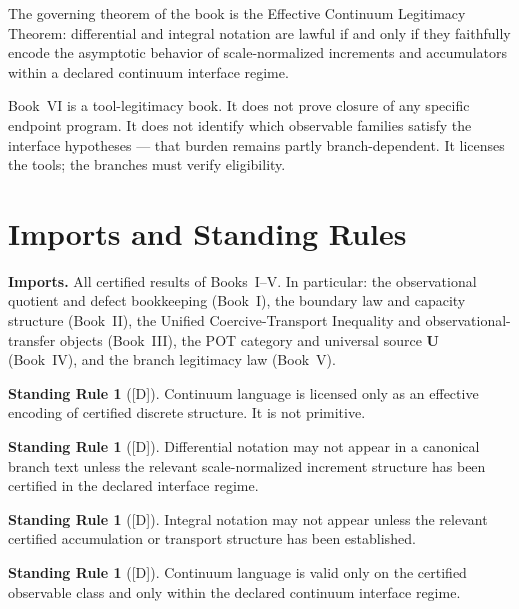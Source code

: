 \documentclass[12pt,oneside]{amsbook}
\theoremstyle{plain}
\theoremstyle{definition}
\newtheorem{standingrule}[theorem]{Standing Rule}
\theoremstyle{remark}
\newcommand{\status}[1]{\textup{[#1]}}
\begin{document}
The governing theorem of the book is the Effective Continuum
Legitimacy Theorem: differential and integral notation are lawful if
and only if they faithfully encode the asymptotic behavior of
scale-normalized increments and accumulators within a declared
continuum interface regime.

Book~VI is a tool-legitimacy book.  It does not prove closure of any
specific endpoint program.  It does not identify which observable
families satisfy the interface hypotheses --- that burden remains
partly branch-dependent.  It licenses the tools; the branches must
verify eligibility.

\section{Imports and Standing Rules}

\textbf{Imports.}  All certified results of Books~I--V.  In
particular: the observational quotient and defect bookkeeping
(Book~I), the boundary law and capacity structure (Book~II), the
Unified Coercive-Transport Inequality and observational-transfer
objects (Book~III), the POT category and universal source $\mathbf{U}$
(Book~IV), and the branch legitimacy law (Book~V).

\begin{standingrule}[\status{D}]\label{sr:continuum-earned}
Continuum language is licensed only as an effective encoding of
certified discrete structure.  It is not primitive.
\end{standingrule}

\begin{standingrule}[\status{D}]\label{sr:no-derivative-without-increment}
Differential notation may not appear in a canonical branch text unless
the relevant scale-normalized increment structure has been certified
in the declared interface regime.
\end{standingrule}

\begin{standingrule}[\status{D}]\label{sr:no-integral-without-accumulation}
Integral notation may not appear unless the relevant certified
accumulation or transport structure has been established.
\end{standingrule}

\begin{standingrule}[\status{D}]\label{sr:interface-locality}
Continuum language is valid only on the certified observable class and
only within the declared continuum interface regime.
\end{standingrule}
\end{document}
